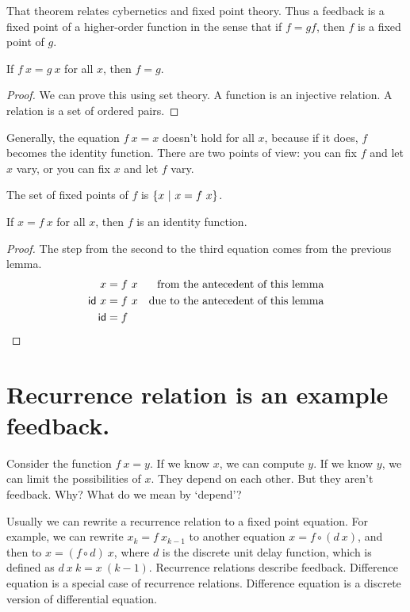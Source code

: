 That theorem relates cybernetics and fixed point theory.
Thus a feedback is a fixed point of a higher-order function
in the sense that if \(f = g f\), then \(f\) is a fixed point of \(g\).

\begin{m:lem}
    If \( f~x = g~x \) for all \(x\), then \(f = g\).
    \begin{proof}
        We can prove this using set theory.
        A function is an injective relation.
        A relation is a set of ordered pairs.
    \end{proof}
\end{m:lem}

Generally, the equation \(f~x = x\) doesn't hold for all \(x\),
because if it does, \(f\) becomes the identity function.
There are two points of view:
you can fix \(f\) and let \(x\) vary, or you can fix \(x\) and let \(f\) vary. 

The set of fixed points of \(f\) is \(\{x~|~x = f~x\}\).

\begin{m:lem}
    If \( x = f~x \) for all \(x\),
    then \(f\) is an identity function.
\begin{proof}
    The step from the second to the third equation
    comes from the previous lemma.
    \begin{align*}
        x &= f~x & \text{from the antecedent of this lemma}
        \\
        \textsf{id}~x &= f~x & \text{due to the antecedent of this lemma}
        \\
        \textsf{id} &= f
    \end{align*}
\end{proof}
\end{m:lem}

\section{Recurrence relation is an example feedback.}

Consider the function \( f~x = y \).
If we know \(x\), we can compute \(y\).
If we know \(y\), we can limit the possibilities of \(x\).
They depend on each other.
But they aren't feedback.
Why?
What do we mean by `depend'?

Usually we can rewrite a recurrence relation to a fixed point equation.
For example, we can rewrite \( x_k = f~x_{k-1} \)
to another equation \( x = f \circ (d~x) \),
and then to \( x = (f \circ d)~x \),
where \( d \) is the discrete unit delay function,
which is defined as \( d~x~k = x~(k-1) \).
Recurrence relations describe feedback.
Difference equation is a special case of recurrence relations.
Difference equation is a discrete version of differential equation.

